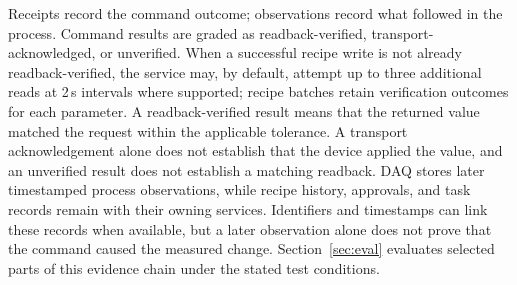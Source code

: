 Receipts record the command outcome; observations record what followed in
the process. Command results are graded as readback-verified,
transport-acknowledged, or unverified. When a successful recipe write is not
already readback-verified, the service may, by default, attempt up to three additional
reads at 2\,s intervals where supported; recipe batches retain verification
outcomes for each parameter. A readback-verified result means that the
returned value matched the request within the applicable tolerance. A transport acknowledgement alone does not
establish that the device applied the value, and an unverified result does
not establish a matching readback. DAQ stores later timestamped process
observations, while recipe history, approvals, and task records remain with
their owning services. Identifiers and timestamps can link these records
when available, but a later observation alone does not prove that the command
caused the measured change. Section~\ref{sec:eval} evaluates selected parts
of this evidence chain under the stated test conditions.

